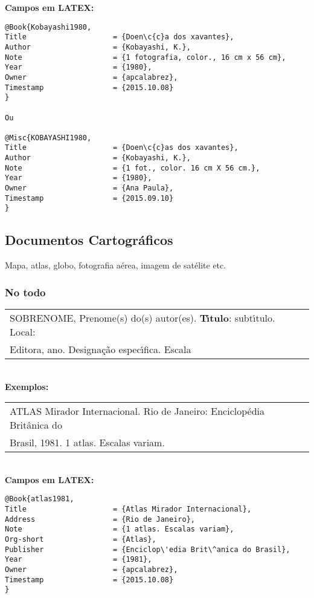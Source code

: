 \textbf{Campos em LATEX:} 

\begin{verbatim}
@Book{Kobayashi1980,
Title                    = {Doen\c{c}a dos xavantes},
Author                   = {Kobayashi, K.},
Note                     = {1 fotografia, color., 16 cm x 56 cm},
Year                     = {1980},
Owner                    = {apcalabrez},
Timestamp                = {2015.10.08}
}

Ou

@Misc{KOBAYASHI1980,
Title                    = {Doen\c{c}as dos xavantes},
Author                   = {Kobayashi, K.},
Note                     = {1 fot., color. 16 cm X 56 cm.},
Year                     = {1980},
Owner                    = {Ana Paula},
Timestamp                = {2015.09.10}
}
\end{verbatim}


\subsection{Documentos Cartogr\'aficos}

Mapa, atlas, globo, fotografia a\'erea, imagem de sat\'elite etc. 
\subsubsection{No todo}

\begin{tabular}{|l|c|} \hline
	SOBRENOME, Prenome(s) do(s) autor(es). \textbf{T\'{\i}tulo}: subt\'{\i}tulo. Local: \\
	Editora, ano. Designa\c{c}\~ao espec\'{\i}fica. Escala
	\\\hline
\end{tabular} \\

\textbf{Exemplos:} \\

\begin{tabular}{|l|c|} \hline
	ATLAS Mirador Internacional. Rio de Janeiro: Enciclop\'edia Brit\^anica do\\
	Brasil, 1981. 1 atlas. Escalas variam. 
	\\\hline
\end{tabular} \\

\textbf{Campos em LATEX:} 

\begin{verbatim}
@Book{atlas1981,
Title                    = {Atlas Mirador Internacional},
Address                  = {Rio de Janeiro},
Note                     = {1 atlas. Escalas variam},
Org-short                = {Atlas},
Publisher                = {Enciclop\'edia Brit\^anica do Brasil},
Year                     = {1981},
Owner                    = {apcalabrez},
Timestamp                = {2015.10.08}
}
\end{verbatim}

